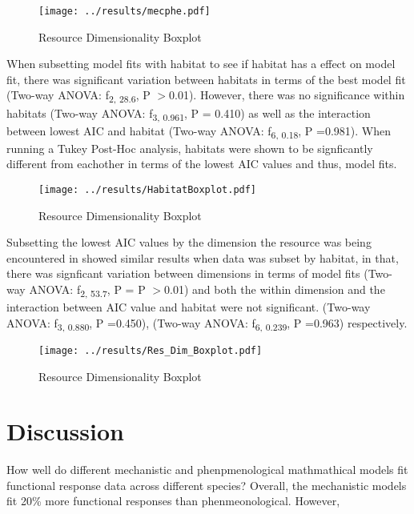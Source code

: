 \documentclass[11pt]{article}
\begin{document}
\begin{figure}[h!]
	
	\texttt{[image: ../results/mecphe.pdf]}
	\caption{Resource Dimensionality Boxplot}
	\label{Model Type comparison}
	
\end{figure}

When subsetting model fits with habitat to see if habitat has a effect on model fit, there was significant variation between habitats in terms of the best model fit (Two-way ANOVA: f\textsubscript{2, 28.6}, P $>$0.01). However, there was no significance within habitats (Two-way ANOVA: f\textsubscript{3, 0.961}, P = 0.410) as well as the interaction between lowest AIC and habitat (Two-way ANOVA: f\textsubscript{6, 0.18}, P =0.981). When running a Tukey Post-Hoc analysis, habitats were shown to be signficantly different from eachother in terms of the lowest AIC values and thus, model fits. 

\begin{figure}[h!]
	\centering 
	\texttt{[image: ../results/HabitatBoxplot.pdf]}
	\caption{Resource Dimensionality Boxplot}
	\label{Habitat Boxplot of model types}
\end{figure}

Subsetting the lowest AIC values by the dimension the resource was being encountered in showed similar results when data was subset by habitat, in that, there was signficant variation between dimensions in terms of model fits (Two-way ANOVA: f\textsubscript{2, 53.7}, P = P $>$0.01) and both the within dimension and the interaction between AIC value and habitat were not significant.  (Two-way ANOVA: f\textsubscript{3, 0.880}, P =0.450),  (Two-way ANOVA: f\textsubscript{6, 0.239}, P =0.963) respectively. 

\begin{figure}[h!]
	\centering 
	\texttt{[image: ../results/Res\_Dim\_Boxplot.pdf]}
	\caption{Resource Dimensionality Boxplot}
	\label{Resource Dimensionality Boxplot of model types}
\end{figure}
\newpage


	\section{Discussion}
\noindent

How well do different mechanistic and phenpmenological mathmathical models fit functional response data across different species?
Overall, the mechanistic models fit 20\% more functional responses than phenmeonological. However, 
\end{document}
